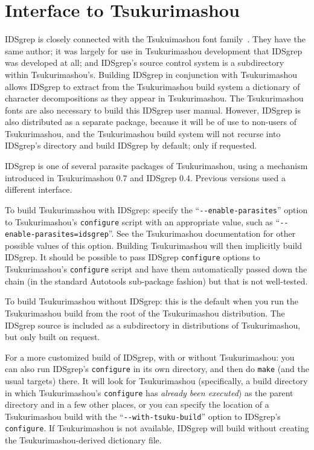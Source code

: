 \documentclass[twocolumn]{report}
\begin{document}

\section{Interface to Tsukurimashou}

IDSgrep is closely connected with the Tsukuimashou font
family~\cite{Tsukurimashou}.  They have the same author; it was largely for
use in Tsukurimashou development that IDSgrep was developed at all; and
IDSgrep's source control system is a subdirectory within Tsukurimashou's. 
Building IDSgrep in conjunction with Tsukurimashou allows IDSgrep to extract
from the Tsukurimashou build system a dictionary of character decompositions
as they appear in Tsukurimashou.  The Tsukurimashou fonts are also necessary
to build this IDSgrep user manual.  However, IDSgrep is also distributed as a
separate package, because it will be of use to non-users of Tsukurimashou,
and the Tsukurimashou build system will not recurse into IDSgrep's directory
and build IDSgrep by default; only if requested.

IDSgrep is one of several parasite packages of Tsukurimashou, using a
mechanism introduced in Tsukurimashou 0.7 and IDSgrep 0.4.  Previous
versions used a different interface.

To build Tsukurimashou with IDSgrep:  specify the
``\texttt{-{}-enable-parasites}'' option to Tsukurimashou's
\texttt{configure} script with an appropriate value, such as
``\texttt{-{}-enable-parasites=idsgrep}''.  See the Tsukurimashou
documentation for other possible values of this option.  Building
Tsukurimashou will then implicitly build IDSgrep.  It should be possible to
pass IDSgrep \texttt{configure} options to Tsukurimashou's
\texttt{configure} script and have them automatically passed down the chain
(in the standard Autotools sub-package fashion) but that is not well-tested.

To build Tsukurimashou without IDSgrep:  this is the default when you run
the Tsukurimashou build from the root of the Tsukurimashou distribution. 
The IDSgrep source is included as a subdirectory in distributions of
Tsukurimashou, but only built on request.

For a more customized build of IDSgrep, with or without Tsukurimashou:  you
can also run IDSgrep's \texttt{configure} in its own directory, and then do
\texttt{make} (and the usual targets) there.  It will look for Tsukurimashou
(specifically, a build directory in which Tsukurimashou's \texttt{configure}
has \emph{already been executed}) as the parent directory and in a few other
places, or you can specify the location of a Tsukurimashou build with the
``\texttt{-{}-with-tsuku-build}'' option to IDSgrep's \texttt{configure}.  If
Tsukurimashou is not available, IDSgrep will build without creating
the Tsukurimashou-derived dictionary file.
\end{document}
